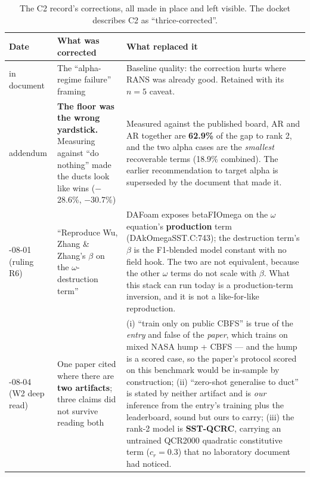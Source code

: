 \documentclass[11pt,a4paper]{article}
\newcommand{\breakus}{\textunderscore\allowbreak}
\newcommand{\code}[1]{{\small\ttfamily\let\_\breakus #1}}
\begin{document}
\begin{table}[h]
\centering
\footnotesize
\caption{The C2 record's corrections, all made in place and left visible. The docket
describes C2 as ``thrice-corrected''.}
\label{tab:corrections}
\begin{tabular}{L{2.1cm}L{4.6cm}L{7.4cm}}
\toprule
Date & What was corrected & What replaced it \\
\midrule
in document &
The ``alpha-regime failure'' framing &
Baseline quality: the correction hurts where RANS was already good. Retained with its
$n=5$ caveat. \\
\addlinespace
addendum &
\textbf{The floor was the wrong yardstick.} Measuring against ``do nothing'' made the ducts
look like wins ($-$28.6\%, $-$30.7\%) &
Measured against the published board, \code{AR\_1} and \code{AR\_3} together are
\textbf{62.9\%} of the gap to rank 2, and the two \code{alpha\_05} cases are the
\emph{smallest} recoverable terms (18.9\% combined). The earlier recommendation to target
\code{alpha\_05} is superseded by the document that made it. \\
-08-01 (ruling R6) &
``Reproduce Wu, Zhang \& Zhang's $\beta$ on the $\omega$-destruction term'' &
DAFoam exposes \code{betaFIOmega\_} on the $\omega$ equation's \textbf{production} term
(\code{DAkOmegaSST.C:743}); the destruction term's $\beta$ is the F1-blended model constant
with no field hook. The two are not equivalent, because the other $\omega$ terms do not
scale with $\beta$. What this stack can run today is a production-term inversion, and it is
not a like-for-like reproduction. \\
-08-04 (W2 deep read) &
One paper cited where there are \textbf{two artifacts}; three claims did not survive
reading both &
(i) ``train only on public CBFS'' is true of the \emph{entry} and false of the
\emph{paper}, which trains on mixed NASA hump + CBFS --- and the hump is a scored case, so
the paper's protocol scored on this benchmark would be in-sample by construction;
(ii) ``zero-shot generalise to duct'' is stated by neither artifact and is \emph{our}
inference from the entry's training plus the leaderboard, sound but ours to carry;
(iii) the rank-2 model is \textbf{SST-QCRC}, carrying an untrained QCR2000 quadratic
constitutive term ($c_r = 0.3$) that no laboratory document had noticed. \\
\bottomrule
\end{tabular}
\end{table}
\end{document}
